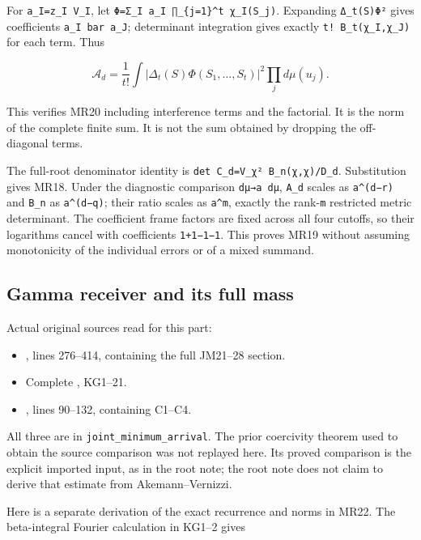 \documentclass[11pt]{article}
\providecommand{\tightlist}{\setlength{\itemsep}{0pt}\setlength{\parskip}{0pt}}
\begin{document}
For \texttt{a\_I=z\_I\ V\_I}, let \texttt{Φ=Σ\_I\ a\_I\ ∏\_\{j=1\}\^{}t\ χ\_I(S\_j)}. Expanding \texttt{\textbar{}Δ\_t(S)Φ\textbar{}²} gives coefficients \texttt{a\_I\ bar\ a\_J}; determinant integration gives exactly \texttt{t!\ B\_t(χ\_I,χ\_J)} for each term. Thus

\[
\mathcal A_d=\frac1{t!}\int|\Delta_t(S)\Phi(S_1,\ldots,S_t)|^2
\prod_jd\mu(u_j).
\]

This verifies MR20 including interference terms and the factorial. It is the norm of the complete finite sum. It is not the sum obtained by dropping the off-diagonal terms.

The full-root denominator identity is \texttt{det\ C\_d=\textbar{}V\_χ\textbar{}²\ B\_n(χ,χ)/D\_d}. Substitution gives MR18. Under the diagnostic comparison \texttt{dμ→a\ dμ}, \texttt{A\_d} scales as \texttt{a\^{}(d−r)} and \texttt{B\_n} as \texttt{a\^{}(d−q)}; their ratio scales as \texttt{a\^{}m}, exactly the rank-\texttt{m} restricted metric determinant. The coefficient frame factors are fixed across all four cutoffs, so their logarithms cancel with coefficients \texttt{1+1−1−1}. This proves MR19 without assuming monotonicity of the individual errors or of a mixed summand.

\subsection{Gamma receiver and its full mass}\label{gamma-receiver-and-its-full-mass}

Actual original sources read for this part:

\begin{itemize}
\tightlist
\item
  , lines 276--414, containing the full JM21--28 section.
\item
  Complete , KG1--21.
\item
  , lines 90--132, containing C1--C4.
\end{itemize}

All three are in \texttt{joint\_minimum\_arrival}. The prior coercivity theorem used to obtain the source comparison was not replayed here. Its proved comparison is the explicit imported input, as in the root note; the root note does not claim to derive that estimate from Akemann--Vernizzi.

Here is a separate derivation of the exact recurrence and norms in MR22. The beta-integral Fourier calculation in KG1--2 gives
\end{document}
